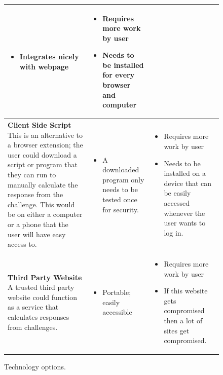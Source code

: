 \documentclass[11pt]{article}
\begin{document}
\begin{figure}[h]
\begin{tabular}{|  p{6cm} | p{5cm} | p{5cm} |}
\begin{itemize}[leftmargin=*]
    \item Integrates nicely with webpage
    \end{itemize}
    &
    \begin{itemize}[leftmargin=*]
    \item Requires more work by user

    \item Needs to be installed for every browser and computer
    \end{itemize}

    \\ \hline
    \vspace{.4cm}
    \textbf{Client Side Script}
    This is an alternative to a browser extension; the user could download a script or program that they can run to manually calculate the response from the challenge. This would be on either a computer or a phone that the user will have easy access to.

    &
    \begin{itemize}[leftmargin=*]
      \item A downloaded program only needs to be tested once for security.
    \end{itemize}

    &
    
    \begin{itemize}[leftmargin=*]
    \item Requires more work by user
    \item Needs to be installed on a device that can be easily accessed whenever the user wants to log in.
    \end{itemize}        

    \\ \hline
    \vspace{.4cm}
    \textbf{Third Party Website}
    A trusted third party website could function as a service that calculates responses from challenges.
    &

    \begin{itemize}[leftmargin=*]
      \item Portable; easily accessible
    \end{itemize}

    &

    \begin{itemize}[leftmargin=*]
      \item Requires more work by user
      \item If this website gets compromised then a lot of sites get compromised.
    \end{itemize}
    
    \\ \hline
    
    \end{tabular}
\caption{Technology options.}
\end{figure}
\normalsize
\end{document}
